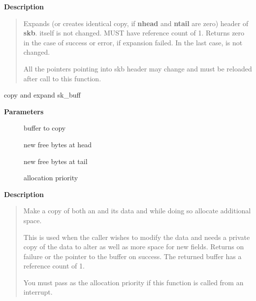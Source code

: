 \documentclass[a4paper,8pt,english]{sphinxmanual}
\begin{document}
\textbf{Description}
\begin{quote}

Expands (or creates identical copy, if \textbf{nhead} and \textbf{ntail} are zero)
header of \textbf{skb}. {\hyperref[networking/kapi:c.sk_buff]{\emph{}}} itself is not changed. {\hyperref[networking/kapi:c.sk_buff]{\emph{}}} MUST have
reference count of 1. Returns zero in the case of success or error,
if expansion failed. In the last case, {\hyperref[networking/kapi:c.sk_buff]{\emph{}}} is not changed.

All the pointers pointing into skb header may change and must be
reloaded after call to this function.
\end{quote}

\begin{fulllineitems}
\label{networking/kapi:c.skb_copy_expand}
copy and expand sk\_buff

\end{fulllineitems}


\textbf{Parameters}
\begin{description}
\item[{}] \leavevmode
buffer to copy

\item[{}] \leavevmode
new free bytes at head

\item[{}] \leavevmode
new free bytes at tail

\item[{}] \leavevmode
allocation priority

\end{description}

\textbf{Description}
\begin{quote}

Make a copy of both an {\hyperref[networking/kapi:c.sk_buff]{\emph{}}} and its data and while doing so
allocate additional space.

This is used when the caller wishes to modify the data and needs a
private copy of the data to alter as well as more space for new fields.
Returns  on failure or the pointer to the buffer
on success. The returned buffer has a reference count of 1.

You must pass  as the allocation priority if this function
is called from an interrupt.
\end{quote}
\end{document}

